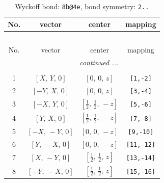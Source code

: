 \documentclass[fleqn,8pt]{jsarticle}
\begin{document}
\begin{longtable}{cccc}
\caption{Wyckoff bond: {\tt 8b@4e}, bond symmetry: {\tt 2..}}
 \\
 \hline \hline
No. & vector & center & mapping \\ \hline \endfirsthead

\multicolumn{3}{l}{\tablename\ \thetable{}} \\
 \hline \hline
No. & vector & center & mapping \\ \hline \endhead

 \hline \hline
\multicolumn{3}{r}{\footnotesize\it continued ...} \\ \endfoot

 \hline \hline
\multicolumn{3}{r}{} \\ \endlastfoot

1 & $\left[ X,\, Y,\, 0 \right]$ & $\left[ 0,\, 0,\, z \right]$ & {\tt [1,-2]} \\ \hline
2 & $\left[ - Y,\, X,\, 0 \right]$ & $\left[ 0,\, 0,\, z \right]$ & {\tt [3,-4]} \\ \hline
3 & $\left[ - X,\, Y,\, 0 \right]$ & $\left[ \frac{1}{2},\, \frac{1}{2},\, - z \right]$ & {\tt [5,-6]} \\ \hline
4 & $\left[ Y,\, X,\, 0 \right]$ & $\left[ \frac{1}{2},\, \frac{1}{2},\, - z \right]$ & {\tt [7,-8]} \\ \hline
5 & $\left[ - X,\, - Y,\, 0 \right]$ & $\left[ 0,\, 0,\, - z \right]$ & {\tt [9,-10]} \\ \hline
6 & $\left[ Y,\, - X,\, 0 \right]$ & $\left[ 0,\, 0,\, - z \right]$ & {\tt [11,-12]} \\ \hline
7 & $\left[ X,\, - Y,\, 0 \right]$ & $\left[ \frac{1}{2},\, \frac{1}{2},\, z \right]$ & {\tt [13,-14]} \\ \hline
8 & $\left[ - Y,\, - X,\, 0 \right]$ & $\left[ \frac{1}{2},\, \frac{1}{2},\, z \right]$ & {\tt [15,-16]} \\
\end{longtable}
\renewcommand{\arraystretch}{1.2}
\end{document}
